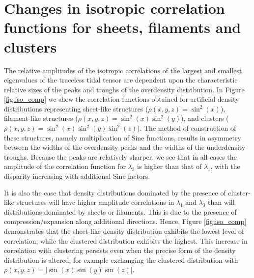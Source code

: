 \documentclass[a4paper,11pt]{article}
\begin{document}
\section{Changes in isotropic correlation functions for sheets, filaments and clusters}\label{app:peaks_troughs}

The relative amplitudes of the isotropic correlations of the largest and smallest eigenvalues of the traceless tidal tensor are dependent upon the characteristic relative sizes of the peaks and troughs of the overdensity distribution. In Figure \ref{fig:iso_comp} we show the correlation functions obtained for artificial density distributions representing sheet-like structures ($\rho(x,y,z) = \sin^2{(x)}$), filament-like structures ($\rho(x,y,z) = \sin^2{(x)}\sin^2{(y)}$), and clusters ($\rho(x,y,z) = \sin^2{(x)}\sin^2{(y)}\sin^2{(z)}$). The method of construction of these structures, namely multiplication of Sine functions, results in asymmetry between the widths of the overdensity peaks and the widths of the underdensity troughs. Because the peaks are relatively sharper, we see that in all cases the amplitude of the correlation function for $\lambda_3$ is higher than that of $\lambda_1$, with the disparity increasing with additional Sine factors.

It is also the case that density distributions dominated by the presence of cluster-like structures will have higher amplitude correlations in $\lambda_1$ and $\lambda_3$ than will distributions dominated by sheets or filaments. This is due to the presence of compression/expansion along additional directions. Hence, Figure \ref{fig:iso_comp} demonstrates that the sheet-like density distribution exhibits the lowest level of correlation, while the clustered distribution exhibits the highest. This increase in correlation with clustering persists even when the precise form of the density distribution is altered, for example exchanging the clustered distribution with $\rho(x,y,z) = \vert \sin{(x)}\sin{(y)}\sin{(z)}\vert$.
\end{document}
